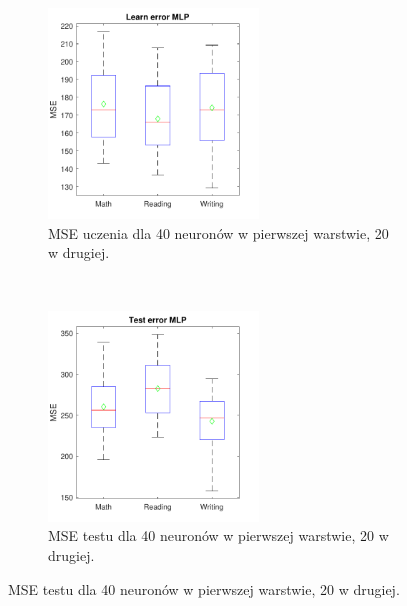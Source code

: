 \documentclass[12pt]{article}
\begin{document}
\begin{figure}[H]
\centering
\begin{subfigure}[t]{0.48\textwidth} 
\centering
\includegraphics[height=2.2in]{radbas_tansig_purelin_20_learnBoxplot.pdf}
\caption{MSE uczenia dla  40 neuronów w pierwszej warstwie, 20 w drugiej.}
\end{subfigure}
~~
\begin{subfigure}[t]{0.48\textwidth} 
\centering
\includegraphics[height=2.2in]{radbas_tansig_purelin_20_testBoxplot.pdf}
\caption{MSE testu dla  40 neuronów w pierwszej warstwie, 20 w drugiej.}
\end{subfigure}


\end{figure}
\end{document}
